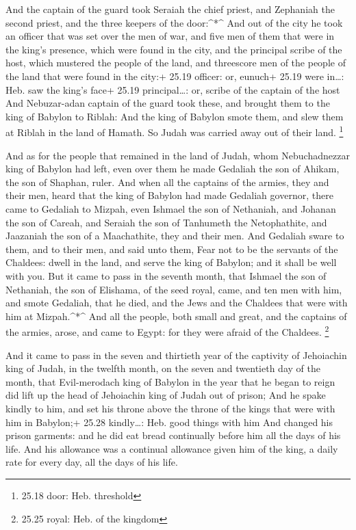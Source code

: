  And the captain of the guard took Seraiah the chief
priest, and Zephaniah the second priest, and the three keepers of the
door:\^{}*\^{}  And out of the city he took an officer that
was set over the men of war, and five men of them that were in the
king's presence, which were found in the city, and the principal scribe
of the host, which mustered the people of the land, and threescore men
of the people of the land that were found in the city:+ 25.19 officer:
or, eunuch+ 25.19 were in\ldots: Heb. saw the king's face+ 25.19
principal\ldots: or, scribe of the captain of the host  And
Nebuzar-adan captain of the guard took these, and brought them to the
king of Babylon to Riblah:  And the king of Babylon smote
them, and slew them at Riblah in the land of Hamath. So Judah was
carried away out of their land. \footnote{25.18 door: Heb. threshold}

 And as for the people that remained in the land of Judah,
whom Nebuchadnezzar king of Babylon had left, even over them he made
Gedaliah the son of Ahikam, the son of Shaphan, ruler.  And
when all the captains of the armies, they and their men, heard that the
king of Babylon had made Gedaliah governor, there came to Gedaliah to
Mizpah, even Ishmael the son of Nethaniah, and Johanan the son of
Careah, and Seraiah the son of Tanhumeth the Netophathite, and Jaazaniah
the son of a Maachathite, they and their men.  And Gedaliah
sware to them, and to their men, and said unto them, Fear not to be the
servants of the Chaldees: dwell in the land, and serve the king of
Babylon; and it shall be well with you.  But it came to
pass in the seventh month, that Ishmael the son of Nethaniah, the son of
Elishama, of the seed royal, came, and ten men with him, and smote
Gedaliah, that he died, and the Jews and the Chaldees that were with him
at Mizpah.\^{}*\^{}  And all the people, both small and
great, and the captains of the armies, arose, and came to Egypt: for
they were afraid of the Chaldees. \footnote{25.25 royal: Heb. of the
  kingdom}

 And it came to pass in the seven and thirtieth year of the
captivity of Jehoiachin king of Judah, in the twelfth month, on the
seven and twentieth day of the month, that Evil-merodach king of Babylon
in the year that he began to reign did lift up the head of Jehoiachin
king of Judah out of prison;  And he spake kindly to him,
and set his throne above the throne of the kings that were with him in
Babylon;+ 25.28 kindly\ldots: Heb. good things with him 
And changed his prison garments: and he did eat bread continually before
him all the days of his life.  And his allowance was a
continual allowance given him of the king, a daily rate for every day,
all the days of his life.
